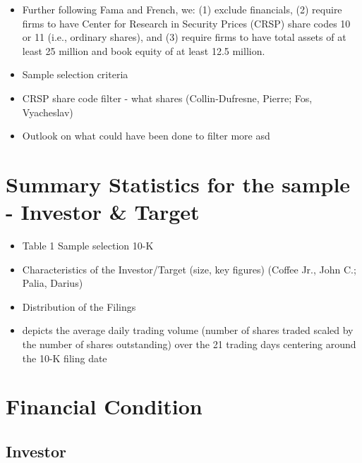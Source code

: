 \documentclass[12pt]{article}
\begin{document}
\begin{itemize}
        \item Further following Fama and French, we: (1) exclude financials, (2) require firms to have Center for Research in Security Prices (CRSP) share codes 10 or 11 (i.e., ordinary shares), and (3) require firms to have total assets of at least 25 million and book equity of at least 12.5 million. \citep{Choi2012}
        \item Sample selection criteria
        \item CRSP share code filter - what shares (Collin-Dufresne, Pierre; Fos, Vyacheslav)
        \item Outlook on what could have been done to filter more asd
    \end{itemize}

\section{Summary Statistics for the sample - Investor \& Target}

\begin{itemize}
    \item Table 1 Sample selection 10-K \citep{You2009}
    \item Characteristics of the Investor/Target (size, key figures) (Coffee Jr., John C.; Palia, Darius)
    \item Distribution of the Filings
    \item depicts the average daily trading volume (number of shares traded scaled by the number of shares outstanding) over the 21 trading days centering around the 10-K filing date \citep{You2009}
\end{itemize}

\section{Financial Condition}

\subsection{Investor}
\end{document}
